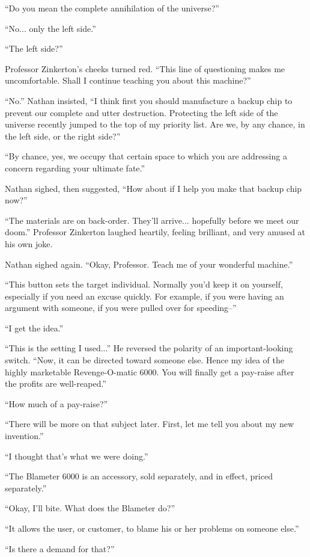 “Do you mean the complete annihilation of the universe?”

“No... only the left side.”

“The left side?”

Professor Zinkerton's cheeks turned red. “This line of questioning makes me uncomfortable. Shall I continue teaching you about this machine?”

“No.” Nathan insisted, “I think first you should manufacture a backup chip to prevent our complete and utter destruction. Protecting the left side of the universe recently jumped to the top of my priority list. Are we, by any chance, in the left side, or the right side?”

“By chance, yes, we occupy that certain space to which you are addressing a concern regarding your ultimate fate.”

Nathan sighed, then suggested, “How about if I help you make that backup chip now?”

“The materials are on back-order. They'll arrive... hopefully before we meet our doom.” Professor Zinkerton laughed heartily, feeling brilliant, and very amused at his own joke.

Nathan sighed again. “Okay, Professor. Teach me of your wonderful machine.”

“This button sets the target individual. Normally you'd keep it on yourself, especially if you need an excuse quickly. For example, if you were having an argument with someone, if you were pulled over for speeding--”

“I get the idea.”

“This is the setting I used...” He reversed the polarity of an important-looking switch. “Now, it can be directed toward someone else. Hence my idea of the highly marketable Revenge-O-matic 6000. You will finally get a pay-raise after the profits are well-reaped.”

“How much of a pay-raise?”

“There will be more on that subject later. First, let me tell you about my new invention.”

“I thought that's what we were doing.”

“The Blameter 6000 is an accessory, sold separately, and in effect, priced separately.”

“Okay, I'll bite. What does the Blameter do?”

“It allows the user, or customer, to blame his or her problems on someone else.”

“Is there a demand for that?”

